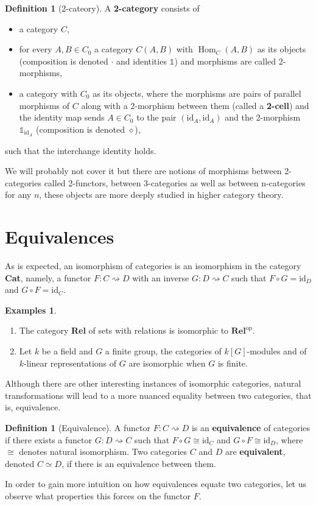 \documentclass{article}
\theoremstyle{definition}
\newtheorem{defn}[thm]{Definition}
\newtheorem{exmps}[thm]{Examples}
\theoremstyle{remark}
\newcommand{\one}{\mathbb{1}}
\DeclareMathOperator{\Hom}{Hom}
\newcommand{\id}{\text{id}}
\newcommand{\op}[1]{#1^{\text{op}}}
\begin{document}
\begin{defn}[2-cateory]
	A \textbf{2-category} consists of
	\begin{itemize}
		\item a category $C$,
		\item for every $A,B \in C_0$ a category $C(A,B)$ with $\Hom_C(A,B)$ as its objects (composition is denoted $\cdot$ and identities $\one$) and morphisms are called 2-morphisms,
		\item a category with $C_0$ as its objects, where the morphisms are pairs of parallel morphisms of $C$ along with a 2-morphism between them (called a \textbf{2-cell}) and the identity map sends $A \in C_0$ to the pair $(\id_A, \id_A)$ and the 2-morphism $\one_{\id_A}$ (composition is denoted $\diamond$),
	\end{itemize} 
	such that the interchange identity holds.
\end{defn}
We will probably not cover it but there are notions of morphisms between 2-categories called 2-functors, between 3-categories as well as between n-categories for any $n$, these objects are more deeply studied in higher category theory.

\section{Equivalences}
As is expected, an isomorphism of categories is an isomorphism in the category \textbf{Cat}, namely, a functor $F:C\rightsquigarrow D$ with an inverse $G:D\rightsquigarrow C$ such that $F \circ G = \id_D$ and $G\circ F = \id_C$.
\begin{exmps}
	\begin{enumerate}
		\item The category \textbf{Rel} of sets with relations is isomorphic to $\op{\textbf{Rel}}$.
		\item Let $k$ be a field and $G$ a finite group, the categories of $k[G]$-modules and of $k$-linear representations of $G$ are isomorphic when $G$ is finite.
	\end{enumerate}
\end{exmps}
 Although there are other interesting instances of isomorphic categories, natural transformations will lead to a more nuanced equality between two categories, that is, equivalence.
\begin{defn}[Equivalence]
	A functor $F:C\rightsquigarrow D$ is an \textbf{equivalence} of categories if there exists a functor $G:D\rightsquigarrow C$ such that $F\circ G\cong \id_{C}$ and $G\circ F \cong \id_{D}$, where $\cong$ denotes natural isomorphism. Two categories $C$ and $D$ are \textbf{equivalent}, denoted $C \simeq D$, if there is an equivalence between them.
\end{defn}
In order to gain more intuition on how equivalences equate two categories, let us observe what properties this forces on the functor $F$.
\end{document}
